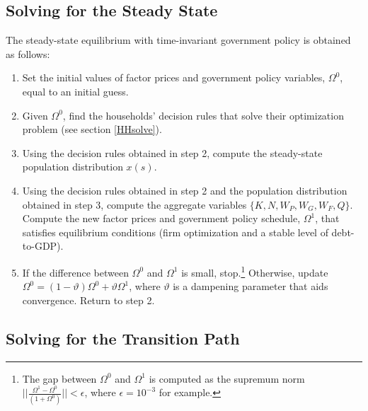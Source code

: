\documentclass[11pt,leqno,fleqn]{article}
\begin{document}
\subsection{Solving for the Steady State}

The steady-state equilibrium with time-invariant government policy is obtained as follows:
\begin{enumerate}
	\item Set the initial values of factor prices and government policy variables, $\Omega^0$, equal to an initial guess.
	\item Given $\Omega^0$, find the households' decision rules that solve their optimization problem (see section \ref{HHsolve}).
	\item Using the decision rules obtained in step 2, compute the steady-state population distribution $x(s)$.
	\item Using the decision rules obtained in step 2 and the population distribution obtained in step 3, compute the aggregate variables $\{K,N,W_P,W_G,W_F,Q\}$. Compute the new factor prices and government policy schedule, $\Omega^1$, that satisfies equilibrium conditions (firm optimization and a stable level of debt-to-GDP).
	\item If the difference between $\Omega^0$ and $\Omega^1$ is small, stop.\footnote{The gap between $\Omega^0$ and $\Omega^1$ is computed as the supremum norm $||\frac{\Omega^1 - \Omega^0}{(1+\Omega^0)}||<\epsilon$, where $\epsilon=10^{-3}$ for example.} Otherwise, update $\Omega^0 = (1-\vartheta)\Omega^0 + \vartheta \Omega^1$, where $\vartheta$ is a dampening parameter that aids convergence. Return to step 2.
\end{enumerate}


\subsection{Solving for the Transition Path}
\end{document}
